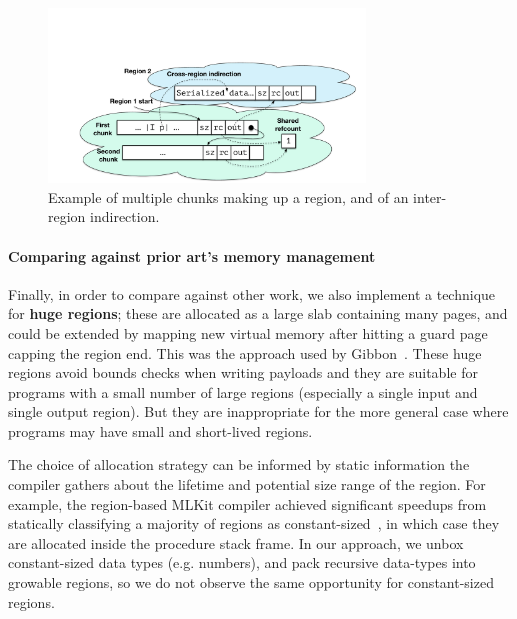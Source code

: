 \begin{figure}
  \vspace{-15mm}
  \begin{center}
    \includegraphics[width=0.75\textwidth]{region-memlayout2}
  \end{center}
  \vspace{-4mm}
  \caption{Example of multiple chunks making up a region, and of an inter-region
    indirection.  \captionscrunch{}}
  \label{fig:regions}
\end{figure}


\paragraph{Comparing against prior art's memory management}
Finally, in order to compare against other work, we also implement a technique
for {\bf huge regions}; these are allocated as a large slab containing many
pages, and could be extended by mapping new virtual memory after hitting a guard
page capping the region end.  This was the approach used by
Gibbon~\cite{ecoop17-gibbon}.
%
These huge regions avoid bounds checks when writing payloads and they are
suitable for programs with a small number of large regions (especially a single
input and single output region).  But they are inappropriate for the more
general case where programs may have small and short-lived regions.
%


The choice of allocation strategy can be informed by static information the
compiler gathers about the lifetime and potential size range of the region. For
example, the region-based MLKit compiler achieved significant speedups from
statically classifying a majority of regions as
constant-sized~\cite{mlkit-retrospective}, in which case they are allocated
inside the procedure stack frame.
%
In our approach, we unbox constant-sized data types (e.g. numbers), and
pack recursive data-types into growable regions, so we do not observe the same
opportunity for constant-sized regions.


